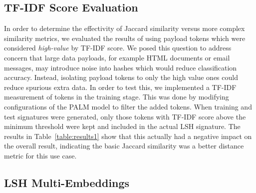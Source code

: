 \subsection{TF-IDF Score Evaluation}
In order to determine the effectivity of Jaccard similarity versus more complex similarity metrics, we evaluated the results of using payload tokens which were considered \textit{high-value} by TF-IDF score. We posed this question to address concern that large data payloads, for example HTML documents or email messages, may introduce noise into hashes which would reduce classification accuracy. Instead, isolating payload tokens to only the high value ones could reduce spurious extra data. In order to test this, we implemented a TF-IDF measurement of tokens in the training stage. This was done by modifying configurations of the PALM model to filter the added tokens. When training and test signatures were generated, only those tokens with TF-IDF score above the minimum threshold were kept and included in the actual LSH signature. The results in Table~\ref{table:results1} show that this actually had a negative impact on the overall result, indicating the basic Jaccard similarity was a better distance metric for this use case.

\subsection{LSH Multi-Embeddings}

